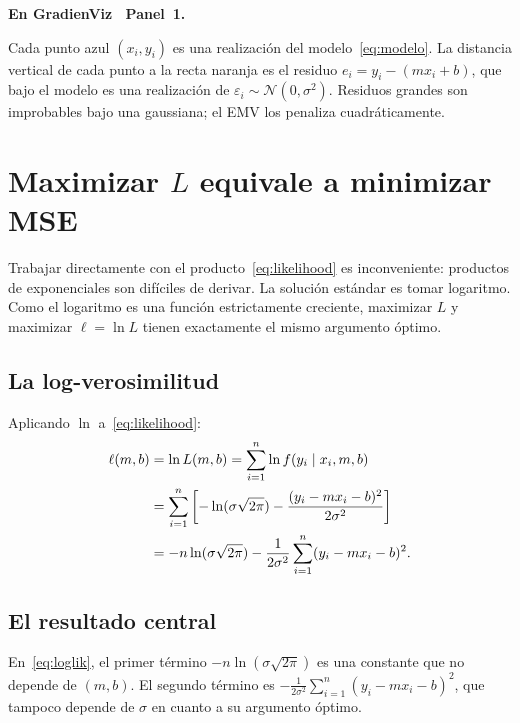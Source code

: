 \documentclass[12pt, a4paper]{article}
\newenvironment{viznota}[1]{%
    \begin{mdframed}[style=vizverde]
    \textbf{\color{bordeteo}En GradienViz \textemdash\ #1.}\quad
}{%
    \end{mdframed}
}
\begin{document}
\begin{viznota}{Panel~1}
Cada punto azul $(x_i, y_i)$ es una realización del modelo~\eqref{eq:modelo}.
La distancia vertical de cada punto a la recta naranja es el residuo
$e_i = y_i - (mx_i + b)$, que bajo el modelo es una realización de
$\varepsilon_i \sim \mathcal{N}(0, \sigma^2)$. Residuos grandes son
improbables bajo una gaussiana; el EMV los penaliza cuadráticamente.
\end{viznota}

\section{Maximizar \texorpdfstring{$L$}{L} equivale a minimizar MSE}

Trabajar directamente con el producto~\eqref{eq:likelihood} es
inconveniente: productos de exponenciales son difíciles de derivar.
La solución estándar es tomar logaritmo. Como el logaritmo es una
función estrictamente creciente, maximizar $L$ y maximizar
$\ell = \ln L$ tienen exactamente el mismo argumento óptimo.

\subsection{La log-verosimilitud}

Aplicando $\ln$ a~\eqref{eq:likelihood}:
\begin{align}
    \ell(m, b) &= \ln L(m, b)
    = \sum_{i=1}^{n} \ln f(y_i \mid x_i, m, b) \notag\\
    &= \sum_{i=1}^{n} \left[
        -\ln(\sigma\sqrt{2\pi})
        - \frac{(y_i - mx_i - b)^2}{2\sigma^2}
    \right] \notag\\
    &= -n\ln(\sigma\sqrt{2\pi})
       - \frac{1}{2\sigma^2}\sum_{i=1}^{n}(y_i - mx_i - b)^2.
    \label{eq:loglik}
\end{align}

\subsection{El resultado central}

En~\eqref{eq:loglik}, el primer término $-n\ln(\sigma\sqrt{2\pi})$
es una constante que no depende de $(m, b)$. El segundo término es
$-\frac{1}{2\sigma^2}\sum_{i=1}^n (y_i - mx_i - b)^2$, que tampoco
depende de $\sigma$ en cuanto a su argumento óptimo.
\end{document}
